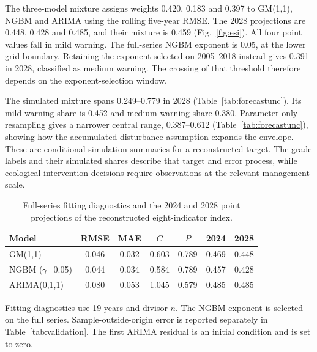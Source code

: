 \documentclass[preprint,11pt,authoryear]{elsarticle}
\begin{document}
The three-model mixture assigns weights 0.420, 0.183 and 0.397 to GM(1,1), NGBM and ARIMA using the rolling five-year RMSE. The 2028 projections are 0.448, 0.428 and 0.485, and their mixture is 0.459 (Fig.~\ref{fig:esi}). All four point values fall in mild warning. The full-series NGBM exponent is 0.05, at the lower grid boundary. Retaining the exponent selected on 2005--2018 instead gives 0.391 in 2028, classified as medium warning. The crossing of that threshold therefore depends on the exponent-selection window.

The simulated mixture spans 0.249--0.779 in 2028 (Table~\ref{tab:forecastunc}). Its mild-warning share is 0.452 and medium-warning share 0.380. Parameter-only resampling gives a narrower central range, 0.387--0.612 (Table~\ref{tab:forecastunc}), showing how the accumulated-disturbance assumption expands the envelope. These are conditional simulation summaries for a reconstructed target. The grade labels and their simulated shares describe that target and error process, while ecological intervention decisions require observations at the relevant management scale.

\begin{table}[htbp]
\centering
\caption{Full-series fitting diagnostics and the 2024 and 2028 point projections of the reconstructed eight-indicator index.}
\label{tab:forecast}
\footnotesize
\setlength{\tabcolsep}{3pt}
\begin{tabular}{lcccccc}
\toprule
Model & RMSE & MAE & $C$ & $P$ & 2024 & 2028 \\
\midrule
GM(1,1) & 0.046 & 0.032 & 0.603 & 0.789 & 0.469 & 0.448 \\
NGBM ($\gamma$=0.05) & 0.044 & 0.034 & 0.584 & 0.789 & 0.457 & 0.428 \\
ARIMA(0,1,1) & 0.080 & 0.053 & 1.045 & 0.579 & 0.485 & 0.485 \\
\bottomrule
\end{tabular}

\vspace{2pt}
{\scriptsize Fitting diagnostics use 19 years and divisor $n$. The NGBM exponent is selected on the full series. Sample-outside-origin error is reported separately in Table~\ref{tab:validation}. The first ARIMA residual is an initial condition and is set to zero.}
\end{table}
\end{document}
